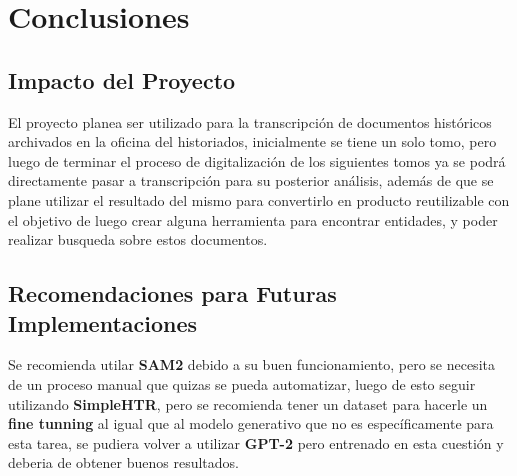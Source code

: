 \documentclass[11pt,a4paper]{article}
\begin{document}
\section{Conclusiones} 
\subsection{Impacto del Proyecto} 

El proyecto planea ser utilizado para la transcripción de documentos hist\'oricos archivados en la oficina del historiados, inicialmente se tiene un solo tomo, pero luego de terminar el proceso de digitalizaci\'on de los siguientes tomos ya se podr\'a directamente pasar a transcripci\'on para su posterior an\'alisis, adem\'as de que se plane utilizar el resultado del mismo para convertirlo en producto reutilizable con el objetivo de luego crear alguna herramienta para encontrar entidades, y poder realizar busqueda sobre estos documentos. 

\subsection{Recomendaciones para Futuras Implementaciones}
Se recomienda utilar \textbf{SAM2} debido a su buen funcionamiento, pero se necesita de un proceso manual que quizas se pueda automatizar, luego de esto seguir utilizando \textbf{SimpleHTR}, pero se recomienda tener un dataset para hacerle un \textbf{fine tunning} al igual que al modelo generativo que no es espec\'ificamente para esta tarea, se pudiera volver a utilizar \textbf{GPT-2} pero entrenado en esta cuesti\'on y deberia de obtener buenos resultados.

 

\end{document}
